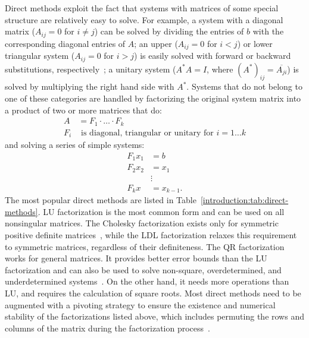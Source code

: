 Direct methods exploit the fact that systems with matrices of some special
structure are relatively easy to solve. For example, a system with a diagonal
matrix ($A_{ij} = 0$ for $i \neq j$) can be solved by dividing the entries of
$b$ with the corresponding diagonal entries of $A$; an upper ($A_{ij} = 0$ for
$i < j$) or lower triangular system ($A_{ij} = 0$ for $i > j$) is easily solved
with forward or backward substitutions, respectively~\cite{demmel,Ipsen2009}; a
unitary system ($A^* A = I$, where $(A^*)_{ij} = \overline{A_{ji}}$)
is solved by multiplying the right hand side with $A^*$. 
Systems that do not belong to one of these categories are handled by
factorizing the original system matrix into a product of two or more matrices
that do:
\begin{align}A &= F_1
    \cdot \ldots \cdot F_k \\
    F_i & \text{ is diagonal, triangular or unitary for } i = 1 \ldots k
\end{align}
and solving a series of simple systems:
\begin{align}
    F_1 x_1 &= b\\
    F_2 x_2 &= x_1\\
    &\vdots \nonumber \\
    F_k x &= x_{k-1}.
\end{align}
The most popular direct methods are listed in
Table~\ref{introduction:tab:direct-methods}. LU factorization is the most common
form and can be used on all nonsingular matrices. The Cholesky factorization
exists only for symmetric positive definite matrices~\cite{demmel}, while the
LDL factorization relaxes this requirement to symmetric matrices, regardless of
their definiteness. The QR factorization works for general matrices. It provides
better error bounds than the LU factorization and can also be used to solve
non-square, overdetermined, and underdetermined systems~\cite{demmel}. On the
other hand, it needs more operations than LU, and requires the calculation of
square roots. Most direct methods need to be augmented with a pivoting strategy
to ensure the existence and numerical stability of the factorizations listed
above, which includes permuting the rows and columns of the matrix during the
factorization process~\cite{demmel}.  
